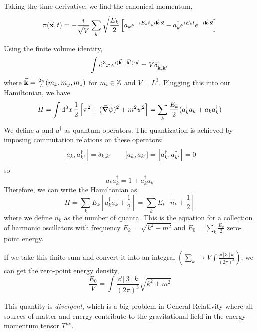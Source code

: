 \documentclass[a4paper,twoside,master.tex]{subfiles}
\begin{document}
Taking the time derivative, we find the canonical momentum,
\begin{equation}
    \pi(\va{x}, t) = - \frac{\imath}{\sqrt{V}} \sum_k \sqrt{\frac{E_k}{2}} \left[ a_k e^{- \imath E_k t} e^{\imath \va{k} \vdot \va{x}} - a^\dagger_k e^{\imath E_k t} e^{- \imath \va{k} \vdot \va{x}} \right]
\end{equation}

Using the finite volume identity,
\begin{equation}
    \int \dd[3]{x}e^{\imath (\va{k} - \va{k}') \vdot \va{x}} = V \delta_{\va{k}, \va{k}'}
\end{equation}
where $ \va{k} = \frac{2 \pi}{L} (m_x, m_y, m_z) $ for $ m_i \in \mathbb{Z} $ and $ V = L^3 $.
Plugging this into our Hamiltonian, we have
\begin{equation}
    H = \int \dd[3]{x} \frac{1}{2} \left[ \pi^2 + (\grad{\psi})^2 + m^2 \psi^2 \right] = \sum_k \frac{E_k}{2} (a^\dagger_k a_k + a_k a^\dagger_k)
\end{equation}
We define $ a $ and $ a^\dagger $ as quantum operators. The quantization is achieved by imposing commutation relations on these operators:
\begin{equation}
    \comm{a_k}{a^\dagger_{k'}} = \delta_{k, k'} \qquad \comm{a_k}{a_{k'}} = \comm{a^\dagger_k}{a^\dagger_{k'}} = 0
\end{equation}
so
\begin{equation}
    a_k a^\dagger_k = 1 + a^\dagger_k a_k
\end{equation}
Therefore, we can write the Hamiltonian as
\begin{equation}
    H = \sum_k E_k \left[ a^\dagger_k a_k + \frac{1}{2} \right] = \sum_k E_k \left[ n_k + \frac{1}{2} \right]
\end{equation}
where we define $ n_k $ as the number of quanta. This is the equation for a collection of harmonic oscillators with frequency $ E_k = \sqrt{k^2 + m^2} $ and $ E_0 = \sum_k \frac{E_k}{2} $ zero-point energy.

If we take this finite sum and convert it into an integral $ \left( \sum_k \to V \int \frac{\dd[3]{k}}{(2 \pi)^3} \right) $, we can get the zero-point energy density,
\begin{equation}
    \frac{E_0}{V} = \int \frac{\dd[3]{k}}{(2 \pi)^3} \sqrt{k^2 + m^2}
\end{equation}

This quantity is \textit{divergent}, which is a big problem in General Relativity where all sources of matter and energy contribute to the gravitational field in the energy-momentum tensor $ T^{\mu \nu} $.
\end{document}
